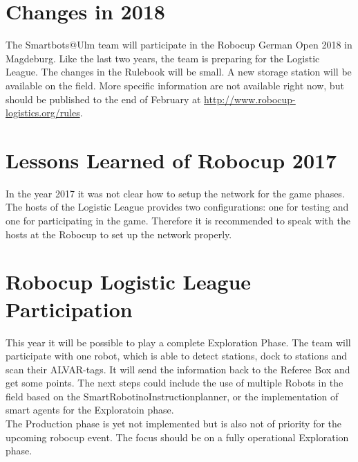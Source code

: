 \section{Changes in 2018}

The Smartbots@Ulm team will participate in the Robocup German Open 2018 in Magdeburg. Like the last two years, the team is preparing for the Logistic League. The changes in the Rulebook will be small. A new storage station will be available on the field. More specific information are not available right now, but should be published to the end of February at \url{http://www.robocup-logistics.org/rules}.


\section{Lessons Learned of Robocup 2017}

In the year 2017 it was not clear how to setup the network for the game phases. The hosts of the Logistic League provides two configurations: one for testing and one for participating in the game. Therefore it is recommended to speak with the hosts at the Robocup to set up the network properly.


\section{Robocup Logistic League Participation}

This year it will be possible to play a complete Exploration Phase. The team will participate with one robot, which is able to detect stations, dock to stations and scan their ALVAR-tags. It will send the information back to the Referee Box and get some points.
The next steps could include the use of multiple Robots in the field based on the SmartRobotinoInstructionplanner, or the implementation of smart agents for the Exploratoin phase. \\
The Production phase is yet not implemented but is also not of priority for the upcoming robocup event. The focus should be on a fully operational Exploration phase.
